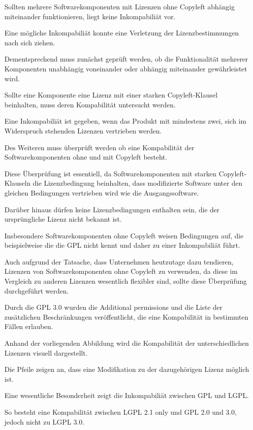 Sollten mehrere Softwarekomponenten mit Lizenzen ohne Copyleft abhängig miteinander funktionieren, liegt keine Inkompabiliät vor. 

Eine mögliche Inkompabiliät konnte eine Verletzung der Lizenzbestimmungen nach sich ziehen. 

Dementsprechend muss zunächst geprüft werden, ob die Funktionalität mehrerer Komponenten unabhängig voneinander oder abhängig miteinander gewährleistet wird.

Sollte eine Komponente eine Lizenz mit einer starken Copyleft-Klausel beinhalten, muss deren Kompabilität untersucht werden. 

Eine Inkompabiliät ist gegeben, wenn das Produkt mit mindestens zwei, sich im Widerspruch stehenden Lizenzen vertrieben werden. 

Des Weiteren muss überprüft werden ob eine Kompabilität der Softwarekomponenten ohne und mit Copyleft besteht. 

Diese Überprüfung ist essentiell, da Softwarekomponenten mit starken Copyleft-Klauseln die Lizenzbedingung beinhalten, dass modifizierte Software unter den gleichen Bedingungen vertrieben wird wie die Ausgangssoftware. 

Darüber hinaus dürfen keine Lizenzbedingungen enthalten sein, die der ursprüngliche Lizenz nicht bekannt ist. 

Insbesondere Softwarekomponenten ohne Copyleft weisen Bedingungen auf, die beispielweise die die GPL nicht kennt und daher zu einer Inkompabiliät führt. 

Auch aufgrund der Tatsache, dass Unternehmen heutzutage dazu tendieren, Lizenzen von Softwarekomponenten ohne Copyleft zu verwenden, da diese im Vergleich zu anderen Lizenzen wesentlich flexibler sind, sollte diese Überprüfung durchgeführt werden. 

Durch die GPL 3.0 wurden die Additional permissions und die Liste der zusätzlichen Beschränkungen veröffentlicht, die eine Kompabilität in bestimmten Fällen erlauben.

Anhand der vorliegenden Abbildung wird die Kompabilität der unterschiedlichen Lizenzen visuell dargestellt. 

Die Pfeile zeigen an, dass eine Modifikation zu der dazugehörigen Lizenz möglich ist. 

Eine wesentliche Besonderheit zeigt die Inkompabiliät zwischen GPL und LGPL. 

So besteht eine Kompabilität zwischen LGPL 2.1 only und GPL 2.0 und 3.0, jedoch nicht zu LGPL 3.0. 

